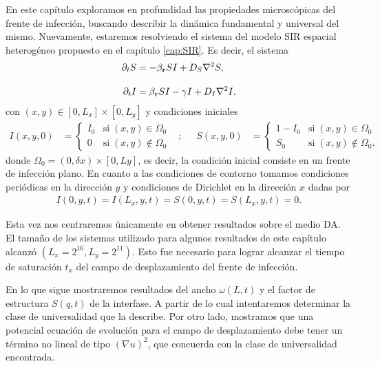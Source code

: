 \graphicspath{{figs/cap6}}


En este capítulo exploramos en profundidad las propiedades microscópicas del frente de infección, buscando describir la dinámica fundamental y universal del mismo. Nuevamente, estaremos resolviendo el sistema del modelo SIR espacial heterogéneo propuesto en el capítulo \ref{cap:SIR}. Es decir, el sistema
\begin{align}
    \partial_t S &=-\beta_{\vb r} SI + D_{S} \laplacian{S},\label{Seqdif}\\[.3cm]
    \partial_t I &=\beta_{\vb r} SI - \gamma I + D_{I} \laplacian{I},\label{Ieqdif}
\end{align}
con $(x,y) \in [0,L_x]\times[0,L_y]$ y condiciones iniciales
\begin{align*}
    I(x,y,0) &= 
    \begin{cases}
    I_0 & \text{si} \; (x,y) \in \Omega_0 \\
    0 & \text{si} \; (x,y) \notin \Omega_0  
    \end{cases}
    & ;&&
    S(x,y,0) &=
    \begin{cases}
    1-I_0 & \text{si} \; (x,y) \in \Omega_0 \\
    S_0 & \text{si} \; (x,y) \notin \Omega_0.
    \end{cases}
\end{align*}
donde $\Omega_0 = (0,\delta x) \times [0,Ly]$, es decir, la condición inicial consiste en un frente de infección plano. En cuanto a las condiciones de contorno tomamos condiciones periódicas en la dirección $y$ y condiciones de Dirichlet en la dirección $x$ dadas por
\begin{align*}
    I(0,y,t)=I(L_x,y,t)=S(0,y,t)=S(L_x,y,t)=0.
\end{align*}

Esta vez nos centraremos únicamente en obtener resultados sobre el medio DA. El tamaño de los sistemas utilizado para algunos resultados de este capítulo alcanzó $(L_x = 2^{16}, L_y =2^{11})$. Esto fue necesario para lograr alcanzar el tiempo de saturación $t_x$ del campo de desplazamiento del frente de infección.

En lo que sigue mostraremos resultados del ancho $\omega(L,t)$ y el factor de estructura $S(q,t)$ de la interfase. A partir de lo cual intentaremos determinar la clase de universalidad que la describe. Por otro lado, mostramos que una potencial ecuación de evolución para el campo de desplazamiento debe tener un término no lineal de tipo $(\nabla u)^2$, que concuerda con la clase de universalidad encontrada.


